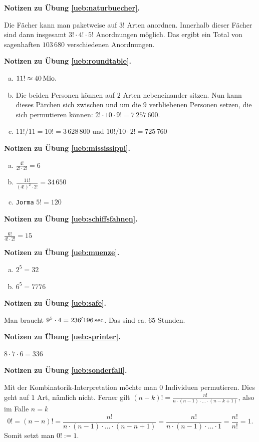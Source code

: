 \documentclass[%
11pt,%
twoside,%
titlepage,%
german,%
headsepline%
]{scrartcl}
\newcommand{\concatueb}[1]{ueb:#1}%
\newcommand{\concatlsg}[1]{lsg:#1}%
\newenvironment{lsg}[1]{%
    \par\noindent\textbf{Notizen zu Übung \ref{\concatueb{#1}}.}%
    \label{\concatlsg{#1}}
}{%
    \par%
}
\begin{document}
\begin{lsg}{naturbuecher}
Die F\"acher kann man paketweise auf $3!$ Arten anordnen. Innerhalb dieser F\"acher sind dann insgesamt $3!\cdot4!\cdot5!$ Anordnungen m\"oglich. Das ergibt ein Total von sagenhaften $103\,680$ verschiedenen Anordnungen.
\end{lsg}
\begin{lsg}{roundtable}
\begin{enumerate}[a)]
\item $11!\approx\unit[40]{Mio.}$
\item Die beiden Personen k\"onnen auf $2$ Arten nebeneinander sitzen. Nun kann dieses P\"archen sich zwischen und um die $9$ verbliebenen Personen setzen, die sich permutieren k\"onnen: $2!\cdot10\cdot 9!=7\,257\,600$.
\item $11!/11=10!=3\,628\,800$ und $10!/10\cdot2!=725\,760$
\end{enumerate}
\end{lsg}
\begin{lsg}{mississippi}
\begin{enumerate}[a)]
\item $\frac{4!}{2!\cdot2!}=6$
\item $\frac{11!}{(4!)^{2}\cdot2!}=34\,650$
\item \texttt{Jorma} $5!=120$
\end{enumerate}
\end{lsg}
\begin{lsg}{schiffsfahnen}
$\frac{6!}{4!\cdot 2!}=15$
\end{lsg}
\begin{lsg}{muenze}
\begin{enumerate}[a)]
\item $2^{5}=32$
\item $6^{5}=7776$
\end{enumerate}
\end{lsg}
\begin{lsg}{safe}
Man braucht $9^{5}\cdot4=\unit[236'196]{sec}$. Das sind ca. $65$ Stunden.
\end{lsg}
\begin{lsg}{sprinter}
$8\cdot7\cdot6=336$
\end{lsg}
\begin{lsg}{sonderfall}
Mit der Kombinatorik-Interpretation m\"ochte man $0$ Individuen permutieren. Dies geht auf $1$ Art, n\"amlich nicht. Ferner gilt $(n-k)!=\frac{n!}{n\cdot(n-1)\cdot\dots\cdot(n-k+1)}$, also im Falle $n=k$
$$0!=(n-n)!=\frac{n!}{n\cdot(n-1)\cdot\dots\cdot(n-n+1)}=\frac{n!}{n\cdot(n-1)\cdot\dots\cdot1}=\frac{n!}{n!}=1.$$
Somit setzt man $0!:=1$.
\end{lsg}
\end{document}
